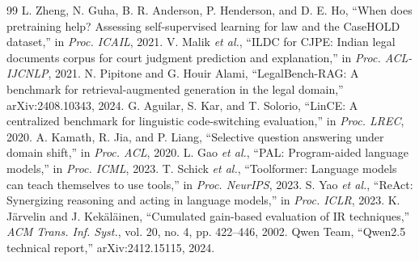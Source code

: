 \documentclass[conference]{IEEEtran}
\begin{document}
\begin{thebibliography}{99}
 L. Zheng, N. Guha, B. R. Anderson, P. Henderson, and D. E. Ho, ``When does pretraining help? Assessing self-supervised learning for law and the CaseHOLD dataset,'' in \emph{Proc. ICAIL}, 2021.
 V. Malik \emph{et al.}, ``ILDC for CJPE: Indian legal documents corpus for court judgment prediction and explanation,'' in \emph{Proc. ACL-IJCNLP}, 2021.
 N. Pipitone and G. Houir Alami, ``LegalBench-RAG: A benchmark for retrieval-augmented generation in the legal domain,'' arXiv:2408.10343, 2024.
 G. Aguilar, S. Kar, and T. Solorio, ``LinCE: A centralized benchmark for linguistic code-switching evaluation,'' in \emph{Proc. LREC}, 2020.
 A. Kamath, R. Jia, and P. Liang, ``Selective question answering under domain shift,'' in \emph{Proc. ACL}, 2020.
 L. Gao \emph{et al.}, ``PAL: Program-aided language models,'' in \emph{Proc. ICML}, 2023.
 T. Schick \emph{et al.}, ``Toolformer: Language models can teach themselves to use tools,'' in \emph{Proc. NeurIPS}, 2023.
 S. Yao \emph{et al.}, ``ReAct: Synergizing reasoning and acting in language models,'' in \emph{Proc. ICLR}, 2023.
 K. J\"arvelin and J. Kek\"al\"ainen, ``Cumulated gain-based evaluation of IR techniques,'' \emph{ACM Trans. Inf. Syst.}, vol. 20, no. 4, pp. 422--446, 2002.
 Qwen Team, ``Qwen2.5 technical report,'' arXiv:2412.15115, 2024.
\end{thebibliography}
\end{document}
